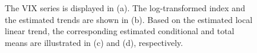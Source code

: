\begin{figure}[H]
	\caption{\label{fig:ex4} The VIX series is displayed in (a). The log-transformed index and the estimated trends are shown in (b). Based on the estimated local linear trend, the corresponding estimated conditional and total means are illustrated in (c) and (d), respectively.}
\end{figure}	

